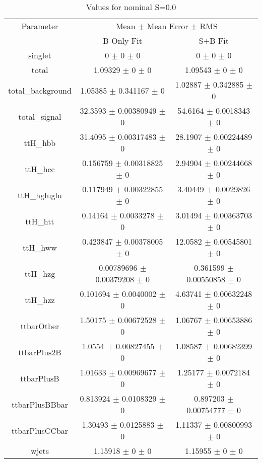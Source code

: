 \begin{table}
\centering
\caption{Values for nominal S=0.0}
\begin{tabular}{ccc}
\toprule
Parameter & \multicolumn{2}{c}{Mean $\pm$ Mean Error $\pm$ RMS}\\
 & B-Only Fit & S+B Fit\\
\midrule
singlet & \num{0} $\pm$ \num{0} $\pm$ \num{0} & \num{0} $\pm$ \num{0} $\pm$ \num{0}\\
total & \num{1.09329} $\pm$ \num{0} $\pm$ \num{0} & \num{1.09543} $\pm$ \num{0} $\pm$ \num{0}\\
total\_background & \num{1.05385} $\pm$ \num{0.341167} $\pm$ \num{0} & \num{1.02887} $\pm$ \num{0.342885} $\pm$ \num{0}\\
total\_signal & \num{32.3593} $\pm$ \num{0.00380949} $\pm$ \num{0} & \num{54.6164} $\pm$ \num{0.0018343} $\pm$ \num{0}\\
ttH\_hbb & \num{31.4095} $\pm$ \num{0.00317483} $\pm$ \num{0} & \num{28.1907} $\pm$ \num{0.00224489} $\pm$ \num{0}\\
ttH\_hcc & \num{0.156759} $\pm$ \num{0.00318825} $\pm$ \num{0} & \num{2.94904} $\pm$ \num{0.00244668} $\pm$ \num{0}\\
ttH\_hgluglu & \num{0.117949} $\pm$ \num{0.00322855} $\pm$ \num{0} & \num{3.40449} $\pm$ \num{0.0029826} $\pm$ \num{0}\\
ttH\_htt & \num{0.14164} $\pm$ \num{0.0033278} $\pm$ \num{0} & \num{3.01494} $\pm$ \num{0.00363703} $\pm$ \num{0}\\
ttH\_hww & \num{0.423847} $\pm$ \num{0.00378005} $\pm$ \num{0} & \num{12.0582} $\pm$ \num{0.00545801} $\pm$ \num{0}\\
ttH\_hzg & \num{0.00789696} $\pm$ \num{0.00379208} $\pm$ \num{0} & \num{0.361599} $\pm$ \num{0.00550858} $\pm$ \num{0}\\
ttH\_hzz & \num{0.101694} $\pm$ \num{0.0040002} $\pm$ \num{0} & \num{4.63741} $\pm$ \num{0.00632248} $\pm$ \num{0}\\
ttbarOther & \num{1.50175} $\pm$ \num{0.00672528} $\pm$ \num{0} & \num{1.06767} $\pm$ \num{0.00653886} $\pm$ \num{0}\\
ttbarPlus2B & \num{1.0554} $\pm$ \num{0.00827455} $\pm$ \num{0} & \num{1.08587} $\pm$ \num{0.00682399} $\pm$ \num{0}\\
ttbarPlusB & \num{1.01633} $\pm$ \num{0.00969677} $\pm$ \num{0} & \num{1.25177} $\pm$ \num{0.0072184} $\pm$ \num{0}\\
ttbarPlusBBbar & \num{0.813924} $\pm$ \num{0.0108329} $\pm$ \num{0} & \num{0.897203} $\pm$ \num{0.00754777} $\pm$ \num{0}\\
ttbarPlusCCbar & \num{1.30493} $\pm$ \num{0.0125883} $\pm$ \num{0} & \num{1.11337} $\pm$ \num{0.00800993} $\pm$ \num{0}\\
wjets & \num{1.15918} $\pm$ \num{0} $\pm$ \num{0} & \num{1.15955} $\pm$ \num{0} $\pm$ \num{0}\\
\bottomrule
\end{tabular}
\end{table}